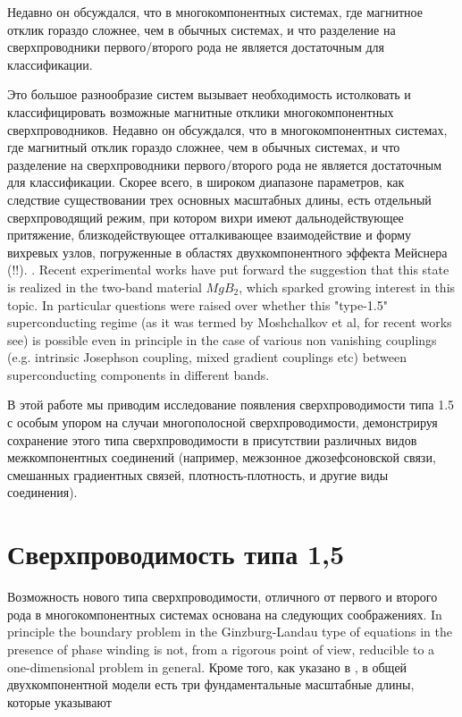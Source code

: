 Недавно он обсуждался, что в многокомпонентных системах, где магнитное отклик 
гораздо сложнее, чем в обычных системах, и что разделение на сверхпроводники 
первого/второго рода не является достаточным для классификации.

Это большое разнообразие систем вызывает необходимость истолковать и 
классифицировать возможные магнитные отклики многокомпонентных 
сверхпроводников. Недавно он обсуждался, что в многокомпонентных системах, 
где магнитный отклик гораздо сложнее, чем в обычных системах, и что разделение 
на сверхпроводники первого/второго рода не является достаточным для 
классификации. Скорее всего, в широком диапазоне параметров, как следствие 
существовании трех основных масштабных длины, есть отдельный сверхпроводящий 
режим, при котором вихри имеют дальнодействующее притяжение, близкодействующее 
отталкивающее взаимодействие и форму вихревых узлов, погруженные в областях 
двухкомпонентного эффекта Мейснера (!!). \cite{bib:1,bib:2}. Recent 
experimental works \cite{bib:16,bib:17} have put forward the suggestion that 
this state is realized in the two-band material \( MgB_2 \), which sparked 
growing interest in this topic. In particular questions were raised over 
whether this "type-1.5" superconducting regime (as it was termed by 
Moshchalkov et al\cite{bib:16}, for recent works see\cite{bib:18}) is possible 
even in principle in the case of various non vanishing couplings (e.g. 
intrinsic Josephson coupling, mixed gradient couplings etc) between 
superconducting components in different bands. 

В этой работе мы приводим исследование появления сверхпроводимости типа 1.5 с 
особым упором на случаи многополосной сверхпроводимости, демонстрируя 
сохранение этого типа сверхпроводимости в присутствии различных видов 
межкомпонентных соединений (например, межзонное джозефсоновской связи, 
смешанных градиентных связей, плотность-плотность, и другие виды соединения).

\section{Сверхпроводимость типа 1,5}
\label{sec:1-1}

Возможность нового типа сверхпроводимости, отличного от первого и второго рода 
в многокомпонентных системах \cite{bib:1,bib:2} основана на следующих 
соображениях. In principle the boundary problem in the 
Ginzburg-Landau type of equations in the presence of phase winding is not, 
from a rigorous point of view, reducible to a one-dimensional problem in 
general. Кроме того, как указано в \cite{bib:1,bib:2}, в общей двухкомпонентной 
модели есть три фундаментальные масштабные длины, которые указывают

